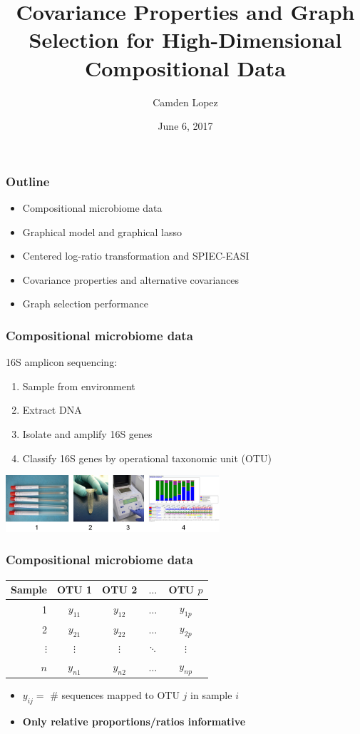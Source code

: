 \documentclass{beamer}
\title{Covariance Properties and Graph Selection for High-Dimensional Compositional Data}
\author{Camden Lopez}
\date{June 6, 2017}
\begin{document}
\begin{frame}
\titlepage
\end{frame}

\begin{frame}
\frametitle{Outline}
\begin{itemize}
\item Compositional microbiome data
\item Graphical model and graphical lasso
\item Centered log-ratio transformation and SPIEC-EASI
\item Covariance properties and alternative covariances
\item Graph selection performance
\end{itemize}
\end{frame}

\begin{frame}
\frametitle{Compositional microbiome data}
16S amplicon sequencing:
\begin{enumerate}
\item Sample from environment
\item Extract DNA
\item Isolate and amplify 16S genes
\item Classify 16S genes by operational taxonomic unit (OTU)
\end{enumerate}
\begin{center}
\includegraphics[width=300px]{figs/16s.png}
\end{center}
\end{frame}

\begin{frame}
\frametitle{Compositional microbiome data}
\begin{center}
\begin{tabular}{r|cccc}
Sample & OTU 1 & OTU 2 & $\dots$ & OTU $p$ \\
\hline
1 & $y_{11}$ & $y_{12}$ & $\dots$ & $y_{1p}$ \\
2 & $y_{21}$ & $y_{22}$ & $\dots$ & $y_{2p}$ \\
$\vdots$ & $\vdots$ & $\vdots$ & $\ddots$ & $\vdots$ \\
$n$ & $y_{n1}$ & $y_{n2}$ & $\dots$ & $y_{np}$
\end{tabular}
\end{center}

\begin{itemize}
\item $y_{ij} = $ \# sequences mapped to OTU $j$ in sample $i$
\item \textbf{Only relative proportions/ratios informative}
\end{itemize}
\end{frame}
\end{document}
